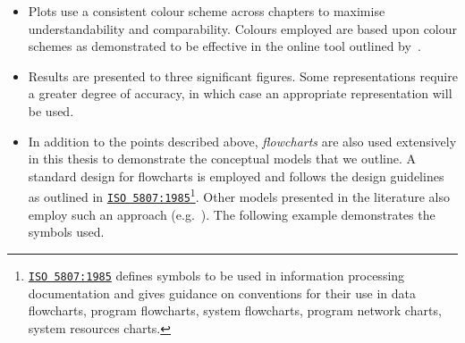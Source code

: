 \begin{preamble}
\begin{itemize}
    \item{Plots use a consistent colour scheme across chapters to maximise understandability and comparability. Colours employed are based upon colour schemes as demonstrated to be effective in the online tool outlined by~\cite{harrower2003colorbrewer}.}
    
    \item{Results are presented to three significant figures. Some representations require a greater degree of accuracy, in which case an appropriate representation will be used.}
    
    \item{In addition to the points described above, \emph{flowcharts} are also used extensively in this thesis to demonstrate the conceptual models that we outline. A standard design for flowcharts is employed and follows the design guidelines as outlined in \href{https://www.iso.org/standard/11955.html}{\texttt{ISO 5807:1985}}\footnote{\href{https://www.iso.org/standard/11955.html}{\texttt{ISO 5807:1985}} defines symbols to be used in information processing documentation and gives guidance on conventions for their use in data flowcharts, program flowcharts, system flowcharts, program network charts, system resources charts.}. Other models presented in the literature also employ such an approach (e.g.~\cite{thomas2014modelling_behaviour}). The following example demonstrates the symbols used.

\begin{figure}[h!]
    \centering
    \hspace*{9mm}
\end{figure}

}
\end{itemize}
\end{preamble}
